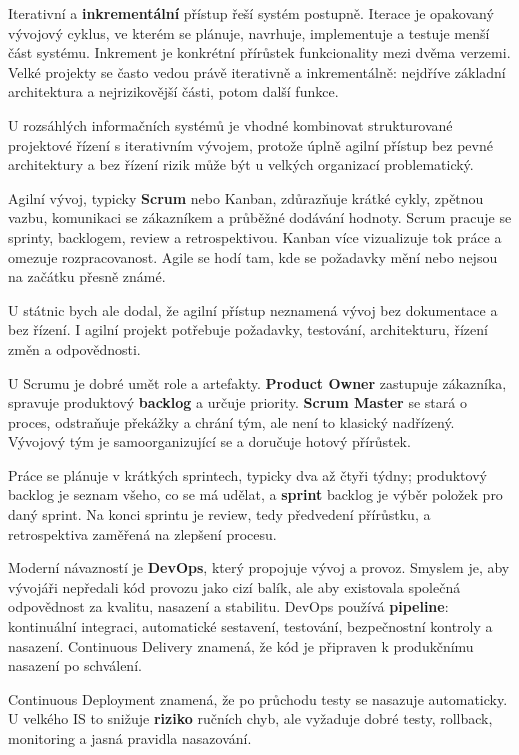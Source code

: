 \documentclass[11pt,a4paper]{article}
\begin{document}
Iterativní a \textbf{inkrementální} přístup řeší systém postupně. Iterace je opakovaný vývojový cyklus, ve kterém se plánuje, navrhuje, implementuje a testuje menší část systému. Inkrement je konkrétní přírůstek funkcionality mezi dvěma verzemi. Velké projekty se často vedou právě iterativně a inkrementálně: nejdříve základní architektura a nejrizikovější části, potom další funkce.

U rozsáhlých informačních systémů je vhodné kombinovat strukturované projektové řízení s iterativním vývojem, protože úplně agilní přístup bez pevné architektury a bez řízení rizik může být u velkých organizací problematický.

Agilní vývoj, typicky \textbf{Scrum} nebo Kanban, zdůrazňuje krátké cykly, zpětnou vazbu, komunikaci se zákazníkem a průběžné dodávání hodnoty. Scrum pracuje se sprinty, backlogem, review a retrospektivou. Kanban více vizualizuje tok práce a omezuje rozpracovanost. Agile se hodí tam, kde se požadavky mění nebo nejsou na začátku přesně známé.

U státnic bych ale dodal, že agilní přístup neznamená vývoj bez dokumentace a bez řízení. I agilní projekt potřebuje požadavky, testování, architekturu, řízení změn a odpovědnosti.

U Scrumu je dobré umět role a artefakty. \textbf{Product Owner} zastupuje zákazníka, spravuje produktový \textbf{backlog} a určuje priority. \textbf{Scrum Master} se stará o proces, odstraňuje překážky a chrání tým, ale není to klasický nadřízený. Vývojový tým je samoorganizující se a doručuje hotový přírůstek.

Práce se plánuje v krátkých sprintech, typicky dva až čtyři týdny; produktový backlog je seznam všeho, co se má udělat, a \textbf{sprint} backlog je výběr položek pro daný sprint. Na konci sprintu je review, tedy předvedení přírůstku, a retrospektiva zaměřená na zlepšení procesu.

Moderní návazností je \textbf{DevOps}, který propojuje vývoj a provoz. Smyslem je, aby vývojáři nepředali kód provozu jako cizí balík, ale aby existovala společná odpovědnost za kvalitu, nasazení a stabilitu. DevOps používá \textbf{pipeline}: kontinuální integraci, automatické sestavení, testování, bezpečnostní kontroly a nasazení. Continuous Delivery znamená, že kód je připraven k produkčnímu nasazení po schválení.

Continuous Deployment znamená, že po průchodu testy se nasazuje automaticky. U velkého IS to snižuje \textbf{riziko} ručních chyb, ale vyžaduje dobré testy, rollback, monitoring a jasná pravidla nasazování.
\end{document}
